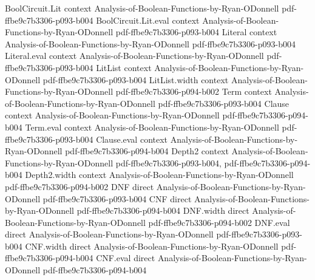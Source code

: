 \begin{theorem}
\label{DecisionTree.fourierCoeff_granular}
\leanok
{}
\proofstep
  {BoolCircuit.Lit}
  {context}
  {Analysis-of-Boolean-Functions-by-Ryan-ODonnell}
  {pdf-ffbe9c7b3306-p093-b004}
\proofstep
  {BoolCircuit.Lit.eval}
  {context}
  {Analysis-of-Boolean-Functions-by-Ryan-ODonnell}
  {pdf-ffbe9c7b3306-p093-b004}
\proofstep
  {Literal}
  {context}
  {Analysis-of-Boolean-Functions-by-Ryan-ODonnell}
  {pdf-ffbe9c7b3306-p093-b004}
\proofstep
  {Literal.eval}
  {context}
  {Analysis-of-Boolean-Functions-by-Ryan-ODonnell}
  {pdf-ffbe9c7b3306-p093-b004}
\proofstep
  {LitList}
  {context}
  {Analysis-of-Boolean-Functions-by-Ryan-ODonnell}
  {pdf-ffbe9c7b3306-p093-b004}
\proofstep
  {LitList.width}
  {context}
  {Analysis-of-Boolean-Functions-by-Ryan-ODonnell}
  {pdf-ffbe9c7b3306-p094-b002}
\proofstep
  {Term}
  {context}
  {Analysis-of-Boolean-Functions-by-Ryan-ODonnell}
  {pdf-ffbe9c7b3306-p093-b004}
\proofstep
  {Clause}
  {context}
  {Analysis-of-Boolean-Functions-by-Ryan-ODonnell}
  {pdf-ffbe9c7b3306-p094-b004}
\proofstep
  {Term.eval}
  {context}
  {Analysis-of-Boolean-Functions-by-Ryan-ODonnell}
  {pdf-ffbe9c7b3306-p093-b004}
\proofstep
  {Clause.eval}
  {context}
  {Analysis-of-Boolean-Functions-by-Ryan-ODonnell}
  {pdf-ffbe9c7b3306-p094-b004}
\proofstep
  {Depth2}
  {context}
  {Analysis-of-Boolean-Functions-by-Ryan-ODonnell}
  {pdf-ffbe9c7b3306-p093-b004,
    pdf-ffbe9c7b3306-p094-b004}
\proofstep
  {Depth2.width}
  {context}
  {Analysis-of-Boolean-Functions-by-Ryan-ODonnell}
  {pdf-ffbe9c7b3306-p094-b002}
\proofstep
  {DNF}
  {direct}
  {Analysis-of-Boolean-Functions-by-Ryan-ODonnell}
  {pdf-ffbe9c7b3306-p093-b004}
\proofstep
  {CNF}
  {direct}
  {Analysis-of-Boolean-Functions-by-Ryan-ODonnell}
  {pdf-ffbe9c7b3306-p094-b004}
\proofstep
  {DNF.width}
  {direct}
  {Analysis-of-Boolean-Functions-by-Ryan-ODonnell}
  {pdf-ffbe9c7b3306-p094-b002}
\proofstep
  {DNF.eval}
  {direct}
  {Analysis-of-Boolean-Functions-by-Ryan-ODonnell}
  {pdf-ffbe9c7b3306-p093-b004}
\proofstep
  {CNF.width}
  {direct}
  {Analysis-of-Boolean-Functions-by-Ryan-ODonnell}
  {pdf-ffbe9c7b3306-p094-b004}
\proofstep
  {CNF.eval}
  {direct}
  {Analysis-of-Boolean-Functions-by-Ryan-ODonnell}
  {pdf-ffbe9c7b3306-p094-b004}

\end{theorem}
